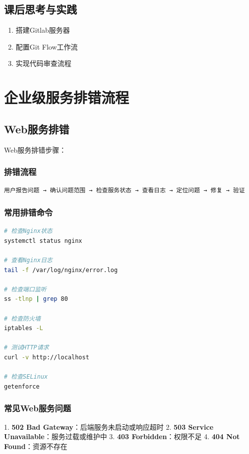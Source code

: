 \documentclass[12pt,UTF8]{ctexbook}
\begin{document}
\section{课后思考与实践}
\label{sec:dev-tools-practice}
\begin{enumerate}
    \item 搭建Gitlab服务器
    \item 配置Git Flow工作流
    \item 实现代码审查流程
\end{enumerate}

\chapter{企业级服务排错流程}
\label{chap:enterprise-troubleshoot}

\section{Web服务排错}
\label{sec:web-troubleshoot}

Web服务排错步骤：

\subsection*{排错流程}
\begin{lstlisting}
用户报告问题 → 确认问题范围 → 检查服务状态 → 查看日志 → 定位问题 → 修复 → 验证
\end{lstlisting}

\subsection*{常用排错命令}
\begin{lstlisting}[language=bash]
# 检查Nginx状态
systemctl status nginx

# 查看Nginx日志
tail -f /var/log/nginx/error.log

# 检查端口监听
ss -tlnp | grep 80

# 检查防火墙
iptables -L

# 测试HTTP请求
curl -v http://localhost

# 检查SELinux
getenforce
\end{lstlisting}

\subsection*{常见Web服务问题}
1. \textbf{502 Bad Gateway}：后端服务未启动或响应超时
2. \textbf{503 Service Unavailable}：服务过载或维护中
3. \textbf{403 Forbidden}：权限不足
4. \textbf{404 Not Found}：资源不存在
\end{document}

